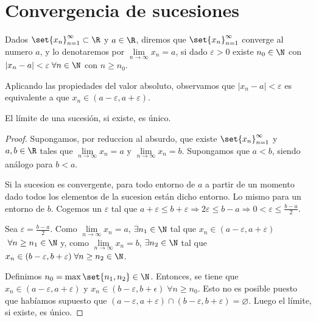 \section{Convergencia de sucesiones}
\begin{definition}[Convergencia]
	Dados \(\set{x_n}^{\infty}_{n=1 } \subset \R 	 \) y \(a \in \R \), diremos que \(\set{x_n}^{\infty}_{n = 1 } \) converge al numero \(a \), y lo denotaremos por \(\lim\limits_{n \to \infty} x_n = a \), si dado \(\varepsilon > 0 \) existe \(n_0 \in \N \) con \(|x_n - a| < \varepsilon \; \forall n \in \N \) con \(n \geq n_0 \).

\end{definition}
\begin{remark}
	Aplicando las propiedades del valor absoluto, observamos que \(|x_n - a | < \varepsilon\) es equivalente a que \(x_n \in (a - \varepsilon, a + \varepsilon)\).
\end{remark}
\begin{proposition}
	El límite de una sucesión, si existe, es único.
\end{proposition}
\begin{proof}
	Supongamos, por reduccion al absurdo, que existe \(\set{x_n}^{\infty}_{n = 1} \) y \(a,b \in \R \) tales que \(\lim\limits_{n \to \infty} x_n = a \) y \(\lim\limits_{n \to \infty} x_n = b \). Supongamos que \(a < b \), siendo análogo para \(b < a \).

	Si la sucesion es convergente, para todo entorno de \(a\) a partir de un momento dado todos los elementos de la sucesion están dicho entorno. Lo mismo para un entorno de \(b \). Cogemos un \(\varepsilon\) tal que \(a + \varepsilon \leq b + \varepsilon \Rightarrow 2\varepsilon \leq b - a \Rightarrow 0 < \varepsilon \leq \frac{b-a}{ 2}\).

	Sea \(\varepsilon = \frac{b-a }{2 }\). Como \(\lim\limits_{n  \to \infty} x_n = a \),  \(\exists n_1 \in \N \) tal que \(x_n \in (a - \varepsilon, a + \varepsilon)\) \( \; \forall n \geq  n_{1} \in \N \) y, como \(\lim\limits_{n \to \infty} x_n = b \),  \( \exists n_2 \in  \N \) tal que \(x_n \in (b - \varepsilon, b + \varepsilon) \; \forall n \geq  n_2 \in \N\).

	Definimos \(n_0 = \max\set{n_1,n_2} \in \N \). Entonces, se tiene que \(x_n \in (a - \varepsilon, a + \varepsilon)\) y \(x_n \in (b - \varepsilon, b + \epsilon) \; \forall n \geq n_0\). Esto no es posible puesto que habíamos supuesto que \((a - \varepsilon, a + \varepsilon) \cap (b - \varepsilon, b + \varepsilon) = \varnothing \). Luego el límite, si existe, es único.
\end{proof}

